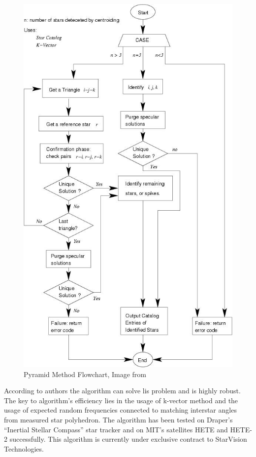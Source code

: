 \documentclass[12pt,a4paper,twoside]{article}
\begin{document}
\begin{figure}[!htbp]
\includegraphics[scale=0.57]{pyramid_method.jpg}
\centering
\caption[Pyramid Method Flowchart]{Pyramid Method Flowchart, Image from \citet{mortari2004pyramid}}
\label{fig:pyramid_method}
\end{figure}

According to authors the algorithm can solve \gls{lis} problem and is highly robust. The key to algorithm's efficiency lies in the usage of k-vector method and the usage of expected random frequencies connected to matching interstar angles from measured star polyhedron. The algorithm has been tested on Draper’s “Inertial Stellar Compass” star tracker\cite{brady2002inertial} and on MIT’s satellites HETE and HETE-2\cite{crew2002hete} successfully. This algorithm is currently under exclusive contract to StarVision Technologies\cite{jacox2006method}\cite{pyramid-starvision}.
\end{document}
